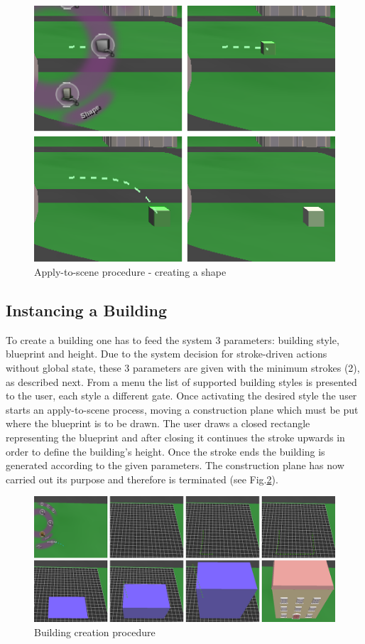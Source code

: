 \begin{figure}[ht]
	\centering
		\includegraphics[scale=0.5]{gfx/apply-to-scene.png}
	\caption{Apply-to-scene procedure - creating a shape}
	\label{fig:apply-to-scene}
\end{figure}



\subsection{Instancing a Building}
\label{design:building}

To create a building one has to feed the system 3 parameters: building style, blueprint and height.
Due to the system decision for stroke-driven actions without global state, these 3 parameters are given with the
minimum strokes (2), as described next.
From a menu the list of supported building styles is presented to the user, each style a different gate.
Once activating the desired style the user starts an apply-to-scene process, moving a construction plane which must
be put where the blueprint is to be drawn.
The user draws a closed rectangle representing the blueprint and after closing it continues
the stroke upwards in order to define the building's height.
Once the stroke ends the building is generated according to the given parameters.
The construction plane has now carried out its purpose and therefore is terminated (see Fig.\ref{fig:building}).

\begin{figure}[ht]
	\centering
		\includegraphics[scale=0.4]{gfx/building.png}
	\caption{Building creation procedure}
	\label{fig:building}
\end{figure}
